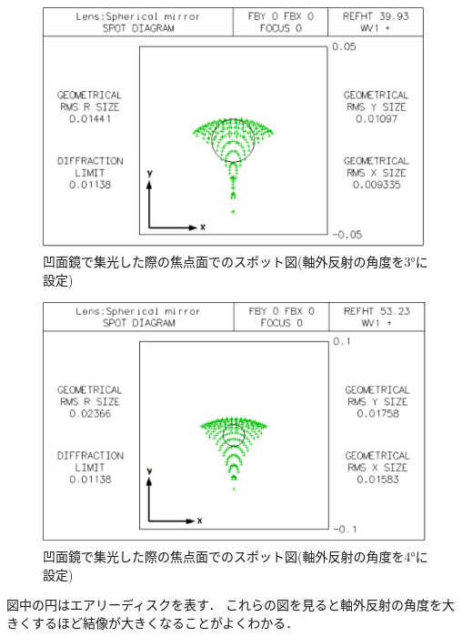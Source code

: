\begin{figure}[htbp]
    \centering
    \includegraphics[scale=0.5]{figure/off_axis_spot_1.5.pdf}
    \caption{凹面鏡で集光した際の焦点面でのスポット図(軸外反射の角度を3°に設定)}
    \label{fig:off_axis_spot_1.5}
\end{figure}
\begin{figure}[htbp]
    \centering
    \includegraphics[scale=0.5]{figure/off_axis_spot_2.pdf}
    \caption{凹面鏡で集光した際の焦点面でのスポット図(軸外反射の角度を4°に設定)}
    \label{fig:off_axis_spot_2}
\end{figure}
図中の円はエアリーディスクを表す．
これらの図を見ると軸外反射の角度を大きくするほど結像が大きくなることがよくわかる．

